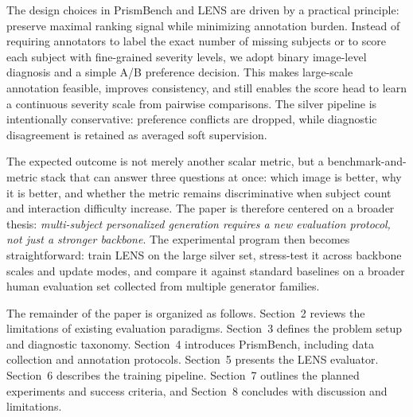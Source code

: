 The design choices in PrismBench and LENS are driven by a practical principle: preserve maximal ranking signal while minimizing annotation burden. Instead of requiring annotators to label the exact number of missing subjects or to score each subject with fine-grained severity levels, we adopt binary image-level diagnosis and a simple A/B preference decision. This makes large-scale annotation feasible, improves consistency, and still enables the score head to learn a continuous severity scale from pairwise comparisons. The silver pipeline is intentionally conservative: preference conflicts are dropped, while diagnostic disagreement is retained as averaged soft supervision.

The expected outcome is not merely another scalar metric, but a benchmark-and-metric stack that can answer three questions at once: which image is better, why it is better, and whether the metric remains discriminative when subject count and interaction difficulty increase. The paper is therefore centered on a broader thesis: \emph{multi-subject personalized generation requires a new evaluation protocol, not just a stronger backbone}. The experimental program then becomes straightforward: train LENS on the large silver set, stress-test it across backbone scales and update modes, and compare it against standard baselines on a broader human evaluation set collected from multiple generator families.

The remainder of the paper is organized as follows. Section~2 reviews the limitations of existing evaluation paradigms. Section~3 defines the problem setup and diagnostic taxonomy. Section~4 introduces PrismBench, including data collection and annotation protocols. Section~5 presents the LENS evaluator. Section~6 describes the training pipeline. Section~7 outlines the planned experiments and success criteria, and Section~8 concludes with discussion and limitations.
